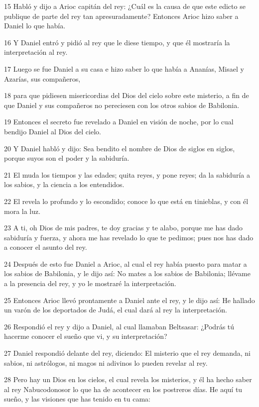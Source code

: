 \par 15 Habló y dijo a Arioc capitán del rey: ¿Cuál es la causa de que este edicto se publique de parte del rey tan apresuradamente? Entonces Arioc hizo saber a Daniel lo que había.
\par 16 Y Daniel entró y pidió al rey que le diese tiempo, y que él mostraría la interpretación al rey.
\par 17 Luego se fue Daniel a su casa e hizo saber lo que había a Ananías, Misael y Azarías, sus compañeros,
\par 18 para que pidiesen misericordias del Dios del cielo sobre este misterio, a fin de que Daniel y sus compañeros no pereciesen con los otros sabios de Babilonia.
\par 19 Entonces el secreto fue revelado a Daniel en visión de noche, por lo cual bendijo Daniel al Dios del cielo.
\par 20 Y Daniel habló y dijo: Sea bendito el nombre de Dios de siglos en siglos, porque suyos son el poder y la sabiduría.
\par 21 El muda los tiempos y las edades; quita reyes, y pone reyes; da la sabiduría a los sabios, y la ciencia a los entendidos.
\par 22 El revela lo profundo y lo escondido; conoce lo que está en tinieblas, y con él mora la luz.
\par 23 A ti, oh Dios de mis padres, te doy gracias y te alabo, porque me has dado sabiduría y fuerza, y ahora me has revelado lo que te pedimos; pues nos has dado a conocer el asunto del rey.
\par 24 Después de esto fue Daniel a Arioc, al cual el rey había puesto para matar a los sabios de Babilonia, y le dijo así: No mates a los sabios de Babilonia; llévame a la presencia del rey, y yo le mostraré la interpretación.
\par 25 Entonces Arioc llevó prontamente a Daniel ante el rey, y le dijo así: He hallado un varón de los deportados de Judá, el cual dará al rey la interpretación.
\par 26 Respondió el rey y dijo a Daniel, al cual llamaban Beltsasar: ¿Podrás tú hacerme conocer el sueño que vi, y su interpretación?
\par 27 Daniel respondió delante del rey, diciendo: El misterio que el rey demanda, ni sabios, ni astrólogos, ni magos ni adivinos lo pueden revelar al rey.
\par 28 Pero hay un Dios en los cielos, el cual revela los misterios, y él ha hecho saber al rey Nabucodonosor lo que ha de acontecer en los postreros días. He aquí tu sueño, y las visiones que has tenido en tu cama:
